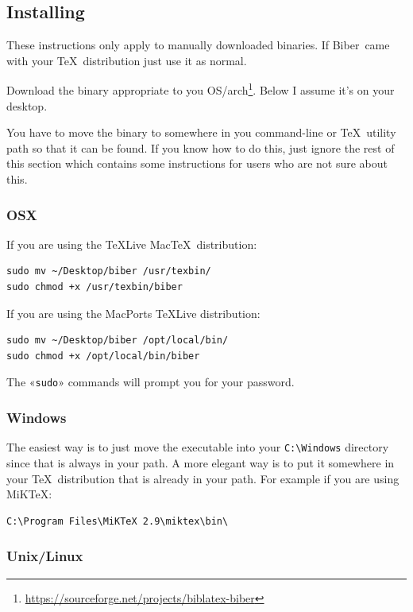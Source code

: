 \documentclass{ltxdockit}
\newcommand*{\biber}{Biber\xspace}
\begin{document}
\subsection{Installing}

These instructions only apply to manually downloaded binaries. If
\biber\ came with your \TeX\ distribution just use it as normal.

Download the binary appropriate to you
OS/arch\footnote{\url{https://sourceforge.net/projects/biblatex-biber}}. Below
I assume it's on your desktop.

You have to move the binary to somewhere in you command-line or \TeX\ utility
path so that it can be found. If you know how to do this, just ignore the
rest of this section which contains some instructions for users who are
not sure about this.

\subsubsection{OSX}

If you are using the \TeX Live Mac\TeX\ distribution:

\begin{verbatim}
sudo mv ~/Desktop/biber /usr/texbin/
sudo chmod +x /usr/texbin/biber
\end{verbatim}

\noindent If you are using the MacPorts \TeX Live distribution:

\begin{verbatim}
sudo mv ~/Desktop/biber /opt/local/bin/
sudo chmod +x /opt/local/bin/biber
\end{verbatim}

\noindent The «\verb+sudo+» commands will prompt you for your password.

\subsubsection{Windows}

The easiest way is to just move the executable into your \verb+C:\Windows+ directory since
that is always in your path. A more elegant way is to put it somewhere in
your \TeX\ distribution that is already in your path. For example if you
are using MiK\TeX:

\begin{verbatim}
C:\Program Files\MiKTeX 2.9\miktex\bin\
\end{verbatim}

\subsubsection{Unix/Linux}
\end{document}
